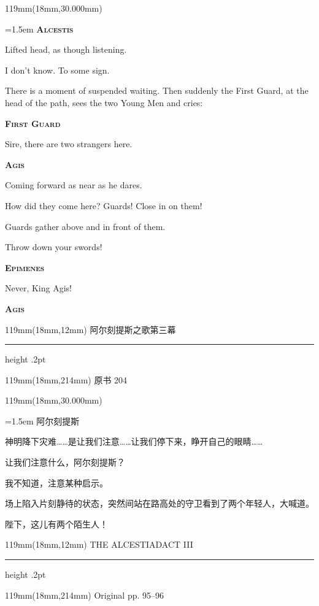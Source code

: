 \documentclass{article}
\newcommand{\ENsetup}{\normalfont\color{ink}\fontsize{11}{16.5}\selectfont\emergencystretch=1.5em}
\newcommand{\ZHsetup}{\normalfont\color{ink}\fontsize{10.5}{17}\selectfont\emergencystretch=1.5em}
\newcommand{\ENspeaker}[1]{{\fontsize{9.8}{13}\selectfont\scshape\bfseries #1}\par\vspace{3pt}}
\newcommand{\ZHspeaker}[1]{{\hei\fontsize{10.3}{13}\selectfont #1}\par\vspace{3pt}}
\newcommand{\Block}[3]{\begin{textblock*}{119mm}(18mm,#1mm){#2 #3\par}\end{textblock*}}
\newcommand{\Heading}[3]{%
  \begin{textblock*}{119mm}(18mm,12mm)
    \color{quiet}\fontsize{7.5}{10}\selectfont
    #1\hfill #2\par\vspace{3mm}\hrule height .2pt
  \end{textblock*}
  \begin{textblock*}{119mm}(18mm,214mm)
    \color{quiet}\fontsize{7}{10}\selectfont #3\hfill\thepage
  \end{textblock*}
}
\begin{document}
\Block{30.000}{\ENsetup}{\sloppy
\ENspeaker{Alcestis}
Lifted head, as though listening.\par\vspace{2pt}
I don't know. To some sign.\par\vspace{2pt}
There is a moment of suspended waiting. Then suddenly the First Guard, at the head of the path, sees the two Young Men and cries:\par\vspace{2pt}
\ENspeaker{First Guard}
Sire, there are two strangers here.\par\vspace{2pt}
\ENspeaker{Agis}
Coming forward as near as he dares.\par\vspace{2pt}
How did they come here? Guards! Close in on them!\par\vspace{2pt}
Guards gather above and in front of them.\par\vspace{2pt}
Throw down your swords!\par\vspace{2pt}
\ENspeaker{Epimenes}
Never, King Agis!\par\vspace{2pt}
\ENspeaker{Agis}}
\newpage
\null
\Heading{阿尔刻提斯之歌}{第三幕}{原书 204}
\Block{30.000}{\ZHsetup}{\ZHspeaker{阿尔刻提斯}神明降下灾难……是让我们注意……让我们停下来，睁开自己的眼睛……\par \vspace{2.2mm}\ZHspeaker{阿吉斯}让我们注意什么，阿尔刻提斯？\par \vspace{2.2mm}\ZHspeaker{阿尔刻提斯}{\kai （抬起头，像是在倾听）}我不知道，注意某种启示。\par \vspace{2.2mm}\kai 场上陷入片刻静待的状态，突然间站在路高处的守卫看到了两个年轻人，大喊道。\par \vspace{2.2mm}\ZHspeaker{守卫一}陛下，这儿有两个陌生人！\par }
\newpage
\null
\Heading{THE ALCESTIAD}{ACT III}{Original pp. 95–96}
\end{document}
